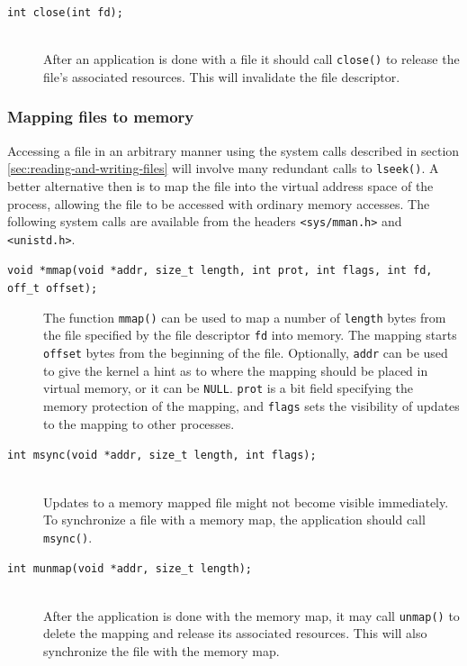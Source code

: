 \begin{description}
\item[\texttt{int close(int fd);}] \hfill \\
After an application is done with a file it should call \texttt{close()} to release the file's associated resources. This will invalidate the file descriptor.
\end{description}

\subsubsection{Mapping files to memory}\label{mapping-files-to-memory}
Accessing a file in an arbitrary manner using the system calls described in section \ref{sec:reading-and-writing-files} will involve many redundant calls to \texttt{lseek()}. A better alternative then is to map the file into the virtual address space of the process, allowing the file to be accessed with ordinary memory accesses. The following system calls are available from the headers \texttt{<sys/mman.h>} and \texttt{<unistd.h>}.

\begin{description}
\item[\texttt{void *mmap(void *addr, size\_t length, int prot, int flags, int fd, off\_t offset);}]
The function \texttt{mmap()} can be used to map a number of \texttt{length} bytes from the file specified by the file descriptor \texttt{fd} into memory. The mapping starts \texttt{offset} bytes from the beginning of the file. Optionally, \texttt{addr} can be used to give the kernel a hint as to where the mapping should be placed in virtual memory, or it can be \texttt{NULL}. \texttt{prot} is a bit field specifying the memory protection of the mapping, and \texttt{flags} sets the visibility of updates to the mapping to other processes.
\item[\texttt{int msync(void *addr, size\_t length, int flags);}] \hfill \\
Updates to a memory mapped file might not become visible immediately. To synchronize a file with a memory map, the application should call \texttt{msync()}.
\item[\texttt{int munmap(void *addr, size\_t length);}] \hfill \\
After the application is done with the memory map, it may call \texttt{unmap()} to delete the mapping and release its associated resources. This will also synchronize the file with the memory map.
\end{description}



